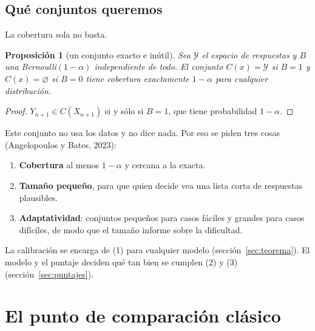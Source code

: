 \documentclass[11pt]{article}
\theoremstyle{plain}
\newtheorem{proposicion}[teorema]{Proposición}
\theoremstyle{definition}
\theoremstyle{remark}
\begin{document}
\subsection{Qué conjuntos queremos}
La cobertura sola no basta.
\begin{proposicion}[un conjunto exacto e inútil]
Sea $\mathcal Y$ el espacio de respuestas y $B$ una Bernoulli$(1-\alpha)$ independiente de todo. El
conjunto $C(x)=\mathcal Y$ si $B=1$ y $C(x)=\varnothing$ si $B=0$ tiene cobertura exactamente
$1-\alpha$ para cualquier distribución.
\end{proposicion}
\begin{proof}
$Y_{n+1}\in C(X_{n+1})$ si y sólo si $B=1$, que tiene probabilidad $1-\alpha$.
\end{proof}
Este conjunto no usa los datos y no dice nada. Por eso se piden tres cosas (Angelopoulos y Bates,
2023):
\begin{enumerate}
\item \textbf{Cobertura} al menos $1-\alpha$ y cercana a la exacta.
\item \textbf{Tamaño pequeño}, para que quien decide vea una lista corta de respuestas plausibles.
\item \textbf{Adaptatividad}: conjuntos pequeños para casos fáciles y grandes para casos difíciles,
de modo que el tamaño informe sobre la dificultad.
\end{enumerate}
La calibración se encarga de (1) para cualquier modelo (sección~\ref{sec:teorema}). El modelo y el
puntaje deciden qué tan bien se cumplen (2) y (3) (sección~\ref{sec:puntajes}).

\section{El punto de comparación clásico}
\end{document}

